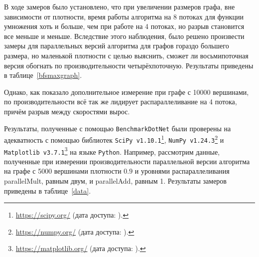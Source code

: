 В ходе замеров было установлено, что при увеличении размеров графа, вне зависимости от плотности, время работы алгоритма на 8 потоках для функции умножения хоть и больше, чем при работе на 4 потоках, но разрыв становится все меньше и меньше. Вследствие этого наблюдения, было решено произвести замеры для параллельных версий алгоритма для графов гораздо большего размера, но маленькой плотности с целью выяснить, сможет ли восьмипоточная версия обогнать по производительности четырёхпоточную. Результаты приведены в таблице~\ref{bfsmaxgraph}.

\begin{table}[h]
\centering
    \caption{Сравнение производительности алгоритма обхода в ширину при использовании 4 и 8 потоков для функции умножения. Графа \texttt{SpeedUp} показывает отношение скорости работы алгоритма при 8 потоках к скорости работы при 4 потоках.}
    \label{bfsmaxgraph}
\end{table}

Однако, как показало дополнительное измерение при графе с 10000 вершинами, по производительности всё так же лидирует распараллеливание на 4 потока, причём разрыв между скоростями вырос.

Результаты, полученные с помощью \texttt{BenchmarkDotNet} были проверены на адекватность с помощью библиотек \texttt{SciPy v1.10.1}\footnote{\url{https://scipy.org/} (дата доступа:   ).}, \texttt{NumPy v1.24.3}\footnote{\url{https://numpy.org/} (дата доступа:   ).} и \texttt{Matplotlib v3.7.1}\footnote{\url{https://matplotlib.org/} (дата доступа:   ).} на языке \texttt{Python}. Например, рассмотрим данные, полученные при измерении производительности параллельной версии алгоритма на графе с 5000 вершинами плотности $0.9$ и уровнями распараллеливания parallelMult, равным двум, и parallelAdd, равным 1. Результаты замеров приведены в таблице~\ref{data}. 

